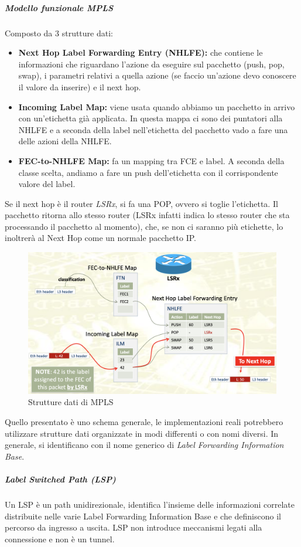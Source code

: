 \documentclass{article}
\begin{document}
\subparagraph{Modello funzionale MPLS}
Composto da 3 strutture dati:
\begin{itemize}
    \item \textbf{Next Hop Label Forwarding Entry (NHLFE):} che contiene le informazioni che riguardano l'azione da eseguire sul pacchetto (push, pop, swap), i parametri relativi a quella azione (se faccio un'azione devo conoscere il valore da inserire) e il next hop.
    \item \textbf{Incoming Label Map:} viene usata quando abbiamo un pacchetto in arrivo con un'etichetta già applicata. In questa mappa ci sono dei puntatori alla NHLFE e a seconda della label nell'etichetta del pacchetto vado a fare una delle azioni della NHLFE.
    \item \textbf{FEC-to-NHLFE Map:} fa un mapping tra FCE e label. A seconda della classe scelta, andiamo a fare un push dell'etichetta con il corrispondente valore del label.
\end{itemize}
Se il next hop è il router \textit{LSRx}, si fa una POP, ovvero si toglie l'etichetta. Il pacchetto ritorna allo stesso router (LSRx infatti indica lo stesso router che sta processando il pacchetto al momento), che, se non ci saranno più etichette, lo inoltrerà al Next Hop come un normale pacchetto IP.
\begin{figure}[H]
    \centering
    \includegraphics[scale=0.3]{figures/mpls strutture dati.png}
    \caption{Strutture dati di MPLS}
\end{figure}
Quello presentato è uno schema generale, le implementazioni reali potrebbero utilizzare strutture dati organizzate in modi differenti o con nomi diversi. In generale, si identificano con il nome generico di \textit{Label Forwarding Information Base}.
\subparagraph{Label Switched Path (LSP)} Un LSP è un path unidirezionale, identifica l'insieme delle informazioni correlate distribuite nelle varie Label Forwarding Information Base e che definiscono il percorso da ingresso a uscita. LSP non introduce meccanismi legati alla connessione e non è un tunnel.
\end{document}
